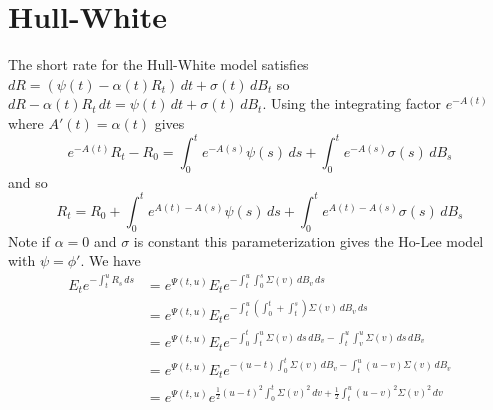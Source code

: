 \documentclass[10pt,letterpaper,fleqn]{report}
\begin{document}
\section{Hull-White}
The short rate for the Hull-White model satisfies
\(dR = (\psi(t) - \alpha(t)R_t)\,dt + \sigma(t)\,dB_t\)
so \(dR - \alpha(t) R_t\,dt = \psi(t)\,dt + \sigma(t)\,dB_t\).
Using the integrating factor \(e^{-A(t)}\) where \(A'(t) = \alpha(t)\) gives
\[
e^{-A(t)}R_t - R_0 = \int_0^t e^{-A(s)}\psi(s)\,ds 
+ \int_0^t e^{-A(s)}\sigma(s)\,dB_s
\]
and so
\[
R_t = R_0 + \int_0^t e^{A(t)-A(s)}\psi(s)\,ds 
+ \int_0^t e^{A(t)-A(s)}\sigma(s)\,dB_s
\]
Note if \(\alpha = 0\) and \(\sigma\) is constant
this parameterization gives the Ho-Lee model with \(\psi = \phi'\).
We have
\begin{align*}
E_t e^{-\int_t^u R_s\,ds}&= e^{\Psi(t,u)}E_t e^{-\int_t^u\int_0^s\Sigma(v)\,dB_v\,ds}\\ 
&= e^{\Psi(t,u)}E_t e^{-\int_t^u(\int_0^t + \int_t^s)\Sigma(v)\,dB_v\,ds}\\ 
&= e^{\Psi(t,u)}E_t e^{-\int_0^t\int_t^u \Sigma(v)\,ds\,dB_v 
- \int_t^u\int_v^u\Sigma(v)\,ds\,dB_v}\\ 
&= e^{\Psi(t,u)}E_t e^{-(u - t)\int_0^t\Sigma(v)\,dB_v 
- \int_t^u(u - v)\Sigma(v)\,dB_v}\\ 
&= e^{\Psi(t,u)}e^{\frac{1}{2}(u - t)^2\int_0^t\Sigma(v)^2\,dv 
+ \frac{1}{2}\int_t^u(u - v)^2\Sigma(v)^2\,dv}\\ 
\end{align*}
\end{document}
